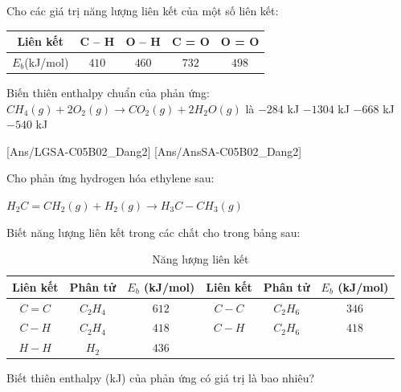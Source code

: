\documentclass[Main.tex]{subfiles}
\begin{document}
\begin{ex}Cho các giá trị năng lượng liên kết của một số liên kết:
	\begin{center}
		\begin{tabular}{|c|c|c|c|c|}
			\hline
			Liên kết & C – H & O – H & C = O & O = O \\
			\hline
			$E_b$(kJ/mol) & $410$ & $460$ & $732$ & $498$ \\
			\hline
		\end{tabular}
	\end{center}
	Biến thiên enthalpy chuẩn của phản ứng: $CH_4(g) + 2O_2(g) \longrightarrow CO_2(g) + 2H_2O(g)$ là
	\choice
	{$-284$ kJ}
	{$- 1304$ kJ}
	{\True $- 668$ kJ}
	{$-540$ kJ}
\end{ex}

[Ans/LGSA-C05B02_Dang2]
[Ans/AnsSA-C05B02_Dang2]
\begin{bt}
	Cho phản ứng hydrogen hóa ethylene sau:
	
	$H_2C=CH_2(g) + H_2(g) \longrightarrow H_3C-CH_3(g)$
	
	Biết năng lượng liên kết trong các chất cho trong bảng sau:
	
	\begin{table}[h]
		\centering
		\begin{tabular}{|c|c|c|c|c|c|}
			\hline
			Liên kết & Phân tử & $E_b$ (kJ/mol) & Liên kết & Phân tử & $E_b$ (kJ/mol) \\
			\hline
			$C=C$ & $C_2H_4$ & $612$ & $C-C$ & $C_2H_6$ & $346$ \\
			\hline
			$C-H$ & $C_2H_4$ & $418$ & $C-H$ & $C_2H_6$ & $418$ \\
			\hline
			$H-H$ & $H_2$ & $436$ &  &  &  \\
			\hline
		\end{tabular}
		\caption{Năng lượng liên kết}
		\label{nang_luong_lien_ket}
	\end{table}
	
	Biết thiên enthalpy (kJ) của phản ứng có giá trị là bao nhiêu?
\end{bt}
\end{document}
